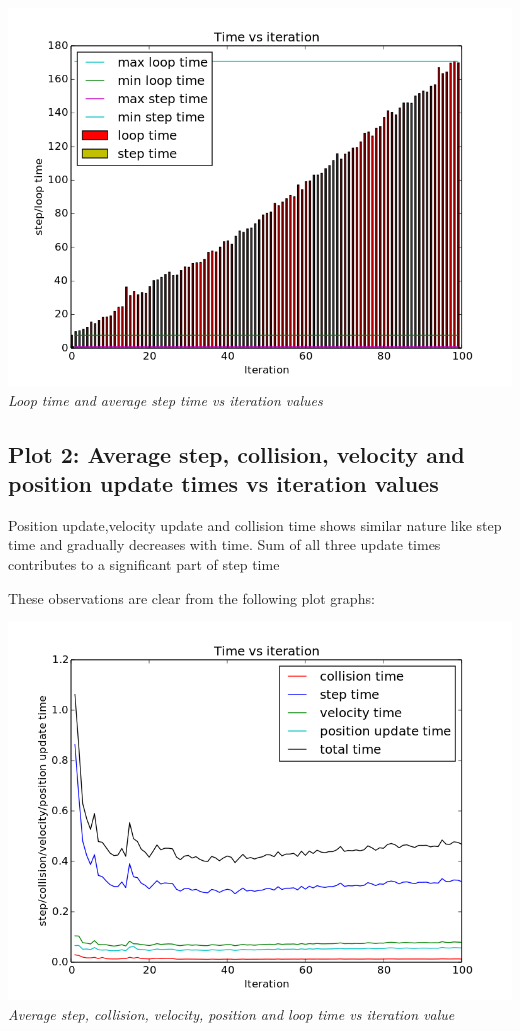 \documentclass[11pt]{article}
\begin{document}
	\begin{center}
	 \includegraphics[scale = 0.4]{images/plots/plot01} \\
	  \emph{Loop time and average step time vs iteration values} \\
	\end{center}


\subsection{Plot 2: Average step, collision, velocity and position update times vs iteration values}

Position update,velocity update and collision time shows similar nature like step time and gradually decreases with time.
Sum of all three update times contributes to a significant part of step time

These observations are clear from the following plot graphs:

\begin{center}
 \includegraphics[scale = 0.4]{images/plots/plot02} \\
  \emph{Average step, collision, velocity, position and loop time vs iteration value} \\
\end{center}
\end{document}
